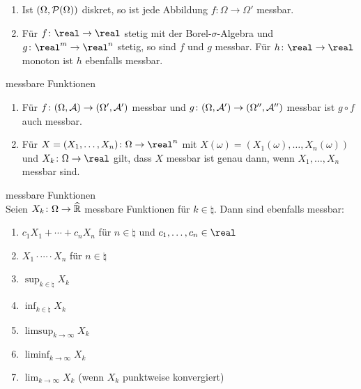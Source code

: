\begin{Bsp}
    \begin{enumerate}
        \item
        Ist $(\Omega, \P(\Omega))$ diskret, so ist jede Abbildung
        $f\colon \Omega \rightarrow \Omega'$ messbar.
        
        \item
        Für $f\colon \real \rightarrow \real$ stetig mit der Borel-$\sigma$-Algebra und
        $g\colon \real^m \rightarrow \real^n$ stetig, so sind $f$ und $g$ messbar.
        Für $h\colon \real \rightarrow \real$ monoton ist $h$ ebenfalls messbar.
    \end{enumerate}
\end{Bsp}

\linie

\begin{Satz}{messbare Funktionen}
    \begin{enumerate}
        \item
        Für $f\colon (\Omega, \A) \rightarrow (\Omega', \A')$ messbar und
        $g\colon (\Omega, \A') \rightarrow (\Omega'', \A'')$ messbar ist
        $g \circ f$ auch messbar.
        
        \item
        Für $X = (X_1, \dotsc, X_n)\colon \Omega \rightarrow \real^n$ mit
        $X(\omega) = (X_1(\omega), \dotsc, X_n(\omega))$ und $X_k\colon \Omega \rightarrow \real$
        gilt, dass $X$ messbar ist genau dann, wenn $X_1, \dotsc, X_n$ messbar sind.
    \end{enumerate}
\end{Satz}

\begin{Satz}{messbare Funktionen}\\
    Seien $X_k\colon \Omega \rightarrow \extreal$ messbare Funktionen für $k \in \natural$.
    Dann sind ebenfalls messbar:
    \begin{enumerate}
        \item
        $c_1 X_1 + \dotsb + c_n X_n$ für $n \in \natural$ und $c_1, \dotsc, c_n \in \real$
        
        \item
        $X_1 \cdot \dotsm \cdot X_n$ für $n \in \natural$
        
        \item
        $\sup_{k \in \natural} X_k$
        
        \item
        $\inf_{k \in \natural} X_k$
        
        \item
        $\limsup_{k \to \infty} X_k$
        
        \item
        $\liminf_{k \to \infty} X_k$
        
        \item
        $\lim_{k \to \infty} X_k$ (wenn $X_k$ punktweise konvergiert)
    \end{enumerate}
\end{Satz}

